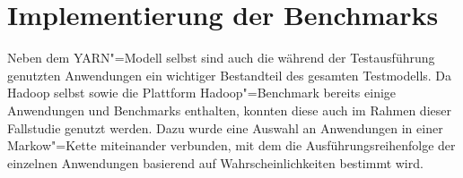 \chapter{Implementierung der Benchmarks}
\label{ch:benchmarks}

Neben dem YARN"=Modell selbst sind auch die während der Testausführung genutzten Anwendungen ein wichtiger Bestandteil des gesamten Testmodells.
Da Hadoop selbst sowie die Plattform Hadoop"=Benchmark bereits einige Anwendungen und Benchmarks enthalten, konnten diese auch im Rahmen dieser Fallstudie genutzt werden.
Dazu wurde eine Auswahl an Anwendungen in einer Markow"=Kette miteinander verbunden, mit dem die Ausführungsreihenfolge der einzelnen Anwendungen basierend auf Wahrscheinlichkeiten bestimmt wird.





